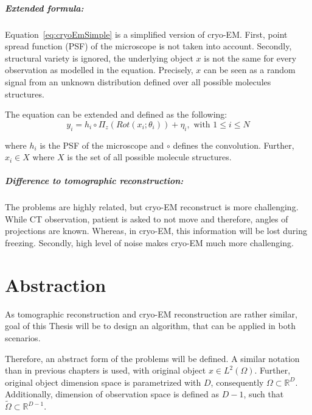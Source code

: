 \subparagraph{Extended formula:} 
Equation~\ref{eq:cryoEmSimple} is a simplified version of cryo-EM.
First, point spread function (PSF) of the microscope is not taken into account.
Secondly, structural variety is ignored, the underlying object $x$ is not the same 
for every observation as modelled in the equation. 
Precisely, $x$ can be seen as a random signal from an unknown distribution defined over all possible molecules structures.

The equation can be extended and defined as the following:
\begin{equation}
    \label{eq:cryoEmExtended}
    y_i = h_i \circ \Pi_z ( \textit{Rot} (x_i; \theta_i)) + \eta_i, \text{ with } 1 \leq i \leq N
\end{equation}

where $h_i$ is the PSF of the microscope and $\circ$ defines the convolution.
Further, $x_i \in X$ where $X$ is the set of all possible molecule structures.


\subparagraph{Difference to tomographic reconstruction:}
The problems are highly related, but cryo-EM reconstruct is more challenging.
While CT observation, patient is asked to not move and therefore, angles of projections are known.
Whereas, in cryo-EM, this information will be lost during freezing.
Secondly, high level of noise makes cryo-EM much more challenging.

\clearpage

\section{Abstraction}

\label{sec:abstract_form}
As tomographic reconstruction and cryo-EM reconstruction are rather similar, 
goal of this Thesis will be to design an algorithm, that can be applied in both scenarios.

Therefore, an abstract form of the problems will be defined.
A similar notation than in previous chapters is used, with original object $x \in L^2(\Omega)$.
Further, original object dimension space is parametrized with $D$, consequently $\Omega \subset \mathbb{R}^D$.
Additionally, dimension of observation space is defined as $D-1$, such that 
$\tilde{\Omega} \subset \mathbb{R}^{D-1}$.


